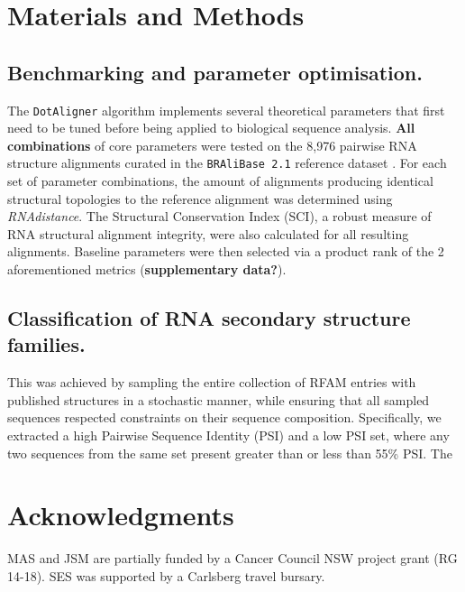 \documentclass[a4paper,11pt]{article}
\newcommand\dotaligner{\texttt{DotAligner}}
\newcommand\bralibase{\texttt{BRAliBase 2.1}}
\begin{document}
\section*{ Materials and Methods }
\subsection*{ Benchmarking and parameter optimisation. }
The \dotaligner{} algorithm implements several theoretical parameters that first need to 
be tuned before being applied to biological sequence analysis.\textbf{ All combinations} of 
core parameters were tested on the 8,976 pairwise RNA structure alignments curated in the 
\bralibase{} reference dataset \cite{Wilm2006enhanced}. For each set of parameter combinations, 
the amount of alignments producing identical structural topologies to the reference alignment
was determined using \textit{RNAdistance}. The Structural Conservation Index (SCI), a robust 
measure of RNA structural alignment integrity, were  also calculated for all resulting alignments. 
Baseline parameters were then selected via a product rank of the 2 aforementioned metrics 
(\textbf{supplementary data?}).\\

\subsection*{ Classification of RNA secondary structure families. }
This was achieved by sampling the entire collection of RFAM entries with published structures 
in a stochastic manner, while ensuring that all sampled sequences respected constraints 
on their sequence composition. Specifically, we extracted a high Pairwise Sequence Identity (PSI) 
and a low PSI set, where any two sequences from the same set present greater than or less than 
55\% PSI. The 

\section*{ Acknowledgments }
MAS and JSM are partially funded by a Cancer Council NSW project grant (RG 14-18). 
SES was supported by a Carlsberg travel bursary. 

 

\end{document}
